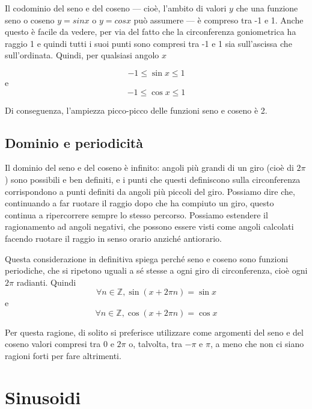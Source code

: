 \documentclass[11pt]{report}
\begin{document}
Il codominio del seno e del coseno --- cioè, l'ambito di valori $y$ che una funzione seno o coseno $y = sin x$ o $y = cos x$ può assumere --- è compreso tra -1 e 1. Anche questo è facile da vedere, per via del fatto che la circonferenza goniometrica ha raggio 1 e quindi tutti i suoi punti sono compresi tra -1 e 1 sia sull'ascissa che sull'ordinata. Quindi, per qualsiasi angolo $x$

\begin{equation}
-1 \leq \sin x \leq 1
\end{equation}
e
\begin{equation}
-1 \leq \cos x \leq 1
\end{equation}

Di conseguenza, l'ampiezza picco-picco delle funzioni seno e coseno è 2.


\subsection{Dominio e periodicità}

Il dominio del seno e del coseno è infinito: angoli più grandi di un giro (cioè di $2\pi$) sono possibili e ben definiti, e i punti che questi definiscono sulla circonferenza corrispondono a punti definiti da angoli più piccoli del giro. Possiamo dire che, continuando a far ruotare il raggio dopo che ha compiuto un giro, questo continua a ripercorrere sempre lo stesso percorso. Possiamo estendere il ragionamento ad angoli negativi, che possono essere visti come angoli calcolati facendo ruotare il raggio in senso orario anziché antiorario.

Questa considerazione in definitiva spiega perché seno e coseno sono funzioni periodiche, che si ripetono uguali a sé stesse a ogni giro di circonferenza, cioè ogni $2 \pi$ radianti. Quindi
\begin{equation}
\forall n \in \mathbb{Z}, \sin(x + 2 \pi n) = \sin x
\end{equation}
e
\begin{equation}
\forall n \in \mathbb{Z}, \cos(x + 2 \pi n) = \cos x
\end{equation}

Per questa ragione, di solito si preferisce utilizzare come argomenti del seno e del coseno valori compresi tra 0 e $2 \pi$ o, talvolta, tra $-\pi$ e $\pi$, a meno che non ci siano ragioni forti per fare altrimenti.





\section{Sinusoidi}
\end{document}
